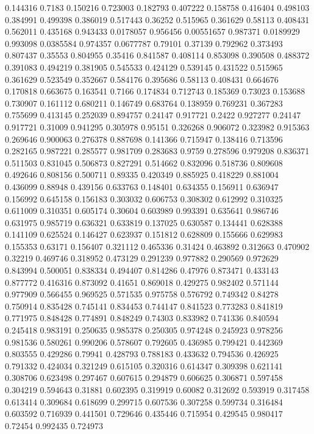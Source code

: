 0.144316 0.7183
0.150216 0.723003
0.182793 0.407222
0.158758 0.416404
0.498103 0.384991
0.499398 0.386019
0.517443 0.36252
0.515965 0.361629
0.58113 0.408431
0.562011 0.435168
0.943433 0.0178057
0.956456 0.00551657
0.987371 0.0189929
0.993098 0.0385584
0.974357 0.0677787
0.79101 0.37139
0.792962 0.373493
0.807437 0.35553
0.804955 0.35416
0.841587 0.408114
0.853098 0.390508
0.488372 0.391083
0.494219 0.381905
0.545533 0.424129
0.539145 0.431522
0.515965 0.361629
0.523549 0.352667
0.584176 0.395686
0.58113 0.408431
0.664676 0.170818
0.663675 0.163541
0.7166 0.174834
0.712743 0.185369
0.73023 0.153688
0.730907 0.161112
0.680211 0.146749
0.683764 0.138959
0.769231 0.367283
0.755699 0.413145
0.252039 0.894757
0.24147 0.917721
0.2422 0.927277
0.24147 0.917721
0.31009 0.941295
0.305978 0.95151
0.326268 0.906072
0.323982 0.915363
0.269646 0.900063
0.276378 0.887698
0.141366 0.715947
0.138416 0.713596
0.282165 0.987221
0.285577 0.981709
0.283683 0.9759
0.278596 0.979208
0.836371 0.511503
0.831045 0.506873
0.827291 0.514662
0.832096 0.518736
0.809608 0.492646
0.808156 0.500711
0.89335 0.420349
0.885925 0.418229
0.881004 0.436099
0.88948 0.439156
0.633763 0.148401
0.634355 0.156911
0.636947 0.156992
0.645158 0.156183
0.303032 0.606753
0.308302 0.612992
0.310325 0.611009
0.310351 0.605174
0.30604 0.603989
0.993391 0.635641
0.986746 0.631975
0.985719 0.636321
0.633819 0.137025
0.630587 0.134441
0.628388 0.141109
0.625524 0.146427
0.623937 0.151812
0.628809 0.155666
0.629983 0.155353
0.63171 0.156407
0.321112 0.465336
0.31424 0.463892
0.312663 0.470902
0.32219 0.469746
0.318952 0.473129
0.291239 0.977882
0.290569 0.972629
0.843994 0.500051
0.838334 0.494407
0.814286 0.47976
0.873471 0.433143
0.877772 0.416316
0.873092 0.41651
0.869018 0.429275
0.982402 0.571144
0.977909 0.566455
0.969525 0.571535
0.975758 0.576792
0.749342 0.84278
0.750914 0.835428
0.745141 0.834453
0.744147 0.841523
0.773283 0.841819
0.771975 0.848428
0.774891 0.848249
0.74303 0.833982
0.741336 0.840594
0.245418 0.983191
0.250635 0.985378
0.250305 0.974248
0.245923 0.978256
0.981536 0.580261
0.990206 0.578607
0.792605 0.436985
0.799421 0.442369
0.803555 0.429286
0.79941 0.428793
0.788183 0.433632
0.794536 0.426925
0.791332 0.424034
0.321249 0.615105
0.320316 0.614347
0.309398 0.621141
0.308706 0.623498
0.297467 0.607615
0.294879 0.606625
0.306871 0.597458
0.304219 0.594643
0.31881 0.602395
0.319919 0.60082
0.312692 0.593919
0.317458 0.613414
0.309684 0.618699
0.299715 0.607536
0.307258 0.599734
0.316484 0.603592
0.716939 0.441501
0.729646 0.435446
0.715954 0.429545
0.980417 0.72454
0.992435 0.724973
